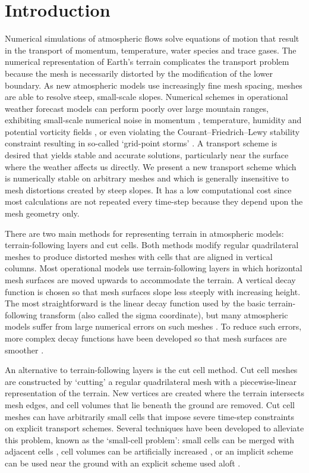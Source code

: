 \section{Introduction}

Numerical simulations of atmospheric flows solve equations of motion that result in the transport of momentum, temperature, water species and trace gases.  The numerical representation of Earth's terrain complicates the transport problem because the mesh is necessarily distorted by the modification of the lower boundary.
As new atmospheric models use increasingly fine mesh spacing, meshes are able to resolve steep, small-scale slopes.  Numerical schemes in operational weather forecast models can perform poorly over large mountain ranges, exhibiting small-scale numerical noise in momentum \citep{walko-avissar2008b}, temperature, humidity \citep{schaer2002} and potential vorticity fields \citep{hoinka-zaengl2004}, or even violating the Courant--Friedrich--Lewy stability constraint resulting in so-called `grid-point storms' \citep{webster2003}.
A transport scheme is desired that yields stable and accurate solutions, particularly near the surface where the weather affects us directly.
We present a new transport scheme which is numerically stable on arbitrary meshes and which is generally insensitive to mesh distortions created by steep slopes.  It has a low computational cost since most calculations are not repeated every time-step because they depend upon the mesh geometry only.

There are two main methods for representing terrain in atmospheric models: terrain-following layers and cut cells.  Both methods modify regular quadrilateral meshes to produce distorted meshes with cells that are aligned in vertical columns.  Most operational models use terrain-following layers in which horizontal mesh surfaces are moved upwards to accommodate the terrain.  A vertical decay function is chosen so that mesh surfaces slope less steeply with increasing height.
The most straightforward is the linear decay function used by the basic terrain-following transform \citep{galchen-somerville1975} (also called the sigma coordinate), but many atmospheric models suffer from large numerical errors on such meshes \citep{schaer2002,klemp2011,eckermann2014}.
To reduce such errors, more complex decay functions have been developed so that mesh surfaces are smoother \citep{simmons-burridge1981,schaer2002,leuenberger2010,klemp2011}.

An alternative to terrain-following layers is the cut cell method.  Cut cell meshes are constructed by `cutting' a regular quadrilateral mesh with a piecewise-linear representation of the terrain.  New vertices are created where the terrain intersects mesh edges, and cell volumes that lie beneath the ground are removed.  Cut cell meshes can have arbitrarily small cells that impose severe time-step constraints on explicit transport schemes.  Several techniques have been developed to alleviate this problem, known as the `small-cell problem': small cells can be merged with adjacent cells \citep{yamazaki2016}, cell volumes can be artificially increased \citep{steppeler2002}, or an implicit scheme can be used near the ground with an explicit scheme used aloft \citep{jebens2011}.

